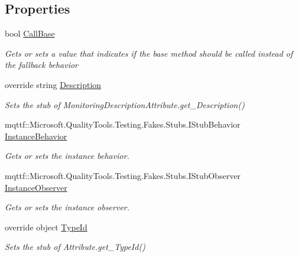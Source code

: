 \subsection*{Properties}
\begin{DoxyCompactItemize}
\item 
bool \hyperlink{class_system_1_1_diagnostics_1_1_fakes_1_1_stub_monitoring_description_attribute_a59751ba7b04732ea2f6210bac338ebb1}{Call\-Base}
\begin{DoxyCompactList}\small\item\em Gets or sets a value that indicates if the base method should be called instead of the fallback behavior\end{DoxyCompactList}\item 
override string \hyperlink{class_system_1_1_diagnostics_1_1_fakes_1_1_stub_monitoring_description_attribute_a6b084b3f0c336a2339c57b0b1e6ddd28}{Description}
\begin{DoxyCompactList}\small\item\em Sets the stub of Monitoring\-Description\-Attribute.\-get\-\_\-\-Description()\end{DoxyCompactList}\item 
mqttf\-::\-Microsoft.\-Quality\-Tools.\-Testing.\-Fakes.\-Stubs.\-I\-Stub\-Behavior \hyperlink{class_system_1_1_diagnostics_1_1_fakes_1_1_stub_monitoring_description_attribute_a5ebdd0415a555b477606ed9f9867e5fa}{Instance\-Behavior}
\begin{DoxyCompactList}\small\item\em Gets or sets the instance behavior.\end{DoxyCompactList}\item 
mqttf\-::\-Microsoft.\-Quality\-Tools.\-Testing.\-Fakes.\-Stubs.\-I\-Stub\-Observer \hyperlink{class_system_1_1_diagnostics_1_1_fakes_1_1_stub_monitoring_description_attribute_a62856389f2f64c4bf6926281f200f54d}{Instance\-Observer}
\begin{DoxyCompactList}\small\item\em Gets or sets the instance observer.\end{DoxyCompactList}\item 
override object \hyperlink{class_system_1_1_diagnostics_1_1_fakes_1_1_stub_monitoring_description_attribute_a44d0cf97170c95020e259a71883163cb}{Type\-Id}
\begin{DoxyCompactList}\small\item\em Sets the stub of Attribute.\-get\-\_\-\-Type\-Id()\end{DoxyCompactList}\end{DoxyCompactItemize}



